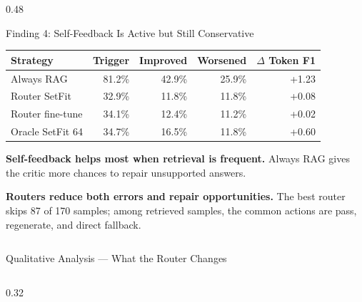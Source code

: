 \documentclass[final]{beamer}
\begin{document}
\begin{frame}[t]
\begin{columns}[t]
\begin{column}{0.48\textwidth}
  \begin{block}{Finding 4: Self-Feedback Is Active but Still Conservative}
    \small
    \begin{tabular}{lrrrr}
      \toprule
      \textbf{Strategy} & \textbf{Trigger} & \textbf{Improved} & \textbf{Worsened} & \textbf{$\Delta$ Token F1} \\
      \midrule
      Always RAG & 81.2\% & 42.9\% & 25.9\% & +1.23 \\
      Router SetFit & 32.9\% & 11.8\% & 11.8\% & +0.08 \\
      Router fine-tune & 34.1\% & 12.4\% & 11.2\% & +0.02 \\
      Oracle SetFit 64 & 34.7\% & 16.5\% & 11.8\% & +0.60 \\
      \bottomrule
    \end{tabular}

    \vspace{0.5em}
    \textbf{\color{successgreen}Self-feedback helps most when retrieval is frequent.}
    Always RAG gives the critic more chances to repair unsupported answers.

    \vspace{0.4em}
    \textbf{\color{primarypurple}Routers reduce both errors and repair opportunities.}
    The best router skips 87 of 170 samples; among retrieved samples, the
    common actions are pass, regenerate, and direct fallback.
  \end{block}
\end{column}

\end{columns}

\begin{block}{Qualitative Analysis --- What the Router Changes}
\begin{columns}[T,onlytextwidth]

\begin{column}{0.32\textwidth}
\end{column}


\end{columns}
\end{block}
\end{frame}
\end{document}
